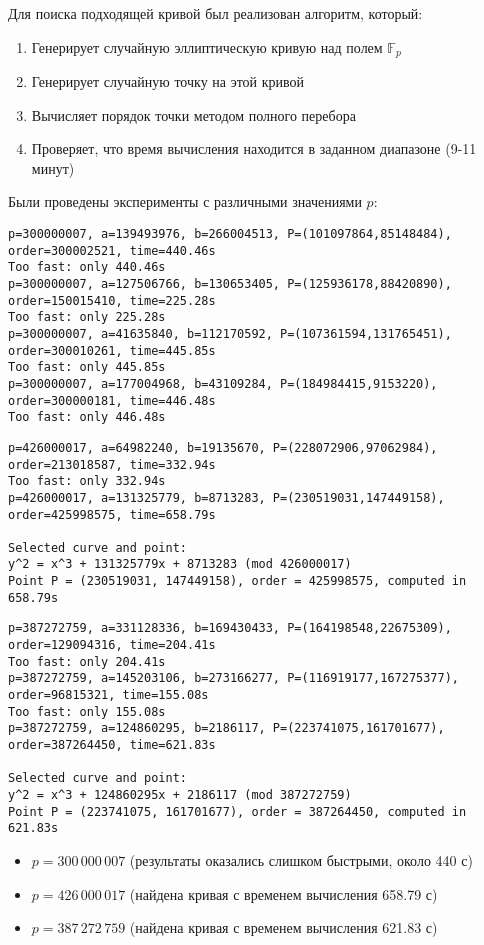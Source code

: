 \documentclass[a4paper,12pt]{article}
\begin{document}
Для поиска подходящей кривой был реализован алгоритм, который:
\begin{enumerate}
    \item Генерирует случайную эллиптическую кривую над полем $\mathbb{F}_p$
    \item Генерирует случайную точку на этой кривой
    \item Вычисляет порядок точки методом полного перебора
    \item Проверяет, что время вычисления находится в заданном диапазоне (9-11 минут)
\end{enumerate}

Были проведены эксперименты с различными значениями $p$:
\begin{lstlisting}
p=300000007, a=139493976, b=266004513, P=(101097864,85148484), order=300002521, time=440.46s
Too fast: only 440.46s
p=300000007, a=127506766, b=130653405, P=(125936178,88420890), order=150015410, time=225.28s
Too fast: only 225.28s
p=300000007, a=41635840, b=112170592, P=(107361594,131765451), order=300010261, time=445.85s
Too fast: only 445.85s
p=300000007, a=177004968, b=43109284, P=(184984415,9153220), order=300000181, time=446.48s
Too fast: only 446.48s
\end{lstlisting}
\begin{lstlisting}
p=426000017, a=64982240, b=19135670, P=(228072906,97062984), order=213018587, time=332.94s
Too fast: only 332.94s
p=426000017, a=131325779, b=8713283, P=(230519031,147449158), order=425998575, time=658.79s

Selected curve and point:
y^2 = x^3 + 131325779x + 8713283 (mod 426000017)
Point P = (230519031, 147449158), order = 425998575, computed in 658.79s
\end{lstlisting}
\begin{lstlisting}
p=387272759, a=331128336, b=169430433, P=(164198548,22675309), order=129094316, time=204.41s
Too fast: only 204.41s
p=387272759, a=145203106, b=273166277, P=(116919177,167275377), order=96815321, time=155.08s
Too fast: only 155.08s
p=387272759, a=124860295, b=2186117, P=(223741075,161701677), order=387264450, time=621.83s

Selected curve and point:
y^2 = x^3 + 124860295x + 2186117 (mod 387272759)
Point P = (223741075, 161701677), order = 387264450, computed in 621.83s
\end{lstlisting}

\begin{itemize}
    \item $p = 300\,000\,007$ (результаты оказались слишком быстрыми, около 440 с)
    \item $p = 426\,000\,017$ (найдена кривая с временем вычисления 658.79 с)
    \item $p = 387\,272\,759$ (найдена кривая с временем вычисления 621.83 с)
\end{itemize}
\end{document}

